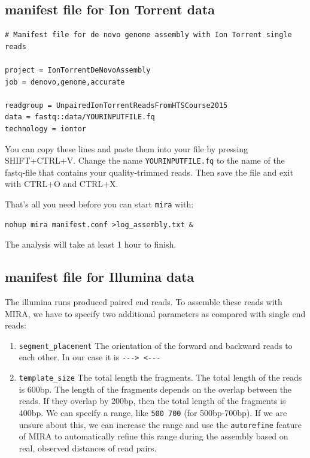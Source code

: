 \documentclass[11pt]{article}
\begin{document}
\subsection{manifest file for Ion Torrent data}
\label{sec-1-1}
\begin{verbatim}
# Manifest file for de novo genome assembly with Ion Torrent single reads

project = IonTorrentDeNovoAssembly
job = denovo,genome,accurate

readgroup = UnpairedIonTorrentReadsFromHTSCourse2015
data = fastq::data/YOURINPUTFILE.fq
technology = iontor
\end{verbatim}

You can copy these lines and paste them into your file by pressing
SHIFT+CTRL+V. Change the name \texttt{YOURINPUTFILE.fq} to the name of the
fastq-file that contains your quality-trimmed reads. Then save the
file and exit with CTRL+O and CTRL+X.

That's all you need before you can start \texttt{mira} with:

\begin{verbatim}
nohup mira manifest.conf >log_assembly.txt &
\end{verbatim}

The analysis will take at least 1 hour to finish.

\subsection{manifest file for Illumina data}
\label{sec-1-2}

The illumina runs produced paired end reads. To assemble these reads
with MIRA, we have to specify two additional parameters as compared
with single end reads:
\begin{enumerate}
\item \texttt{segment\_placement} The orientation of the forward and backward
reads to each other. In our case it is \texttt{-{}-{}-> <-{}-{}-}
\item \texttt{template\_size} The total length the fragments. The total length of
the reads is 600bp. The length of the fragments depends on the
overlap between the reads. If they overlap by 200bp, then the total
length of the fragments is 400bp. We can specify a range, like \texttt{500
   700} (for 500bp-700bp). If we are unsure about this, we can
increase the range and use the \texttt{autorefine} feature of MIRA to
automatically refine this range during the assembly based on real,
observed distances of read pairs.
\end{enumerate}
\end{document}
